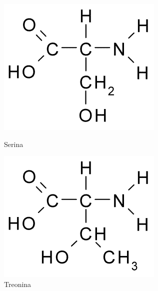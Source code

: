 \documentclass[a4paper,12pt]{article}
\begin{document}
	 \vspace{-1cm}
	\begin{figure}[H]
		\begin{center}
			\begin{minipage}{0.45\linewidth}
				\centering   
				\includegraphics[width=0.5\linewidth]{serine.png}	
				\caption{Serina}
				\label{fig:serine}
			\end{minipage}
			\begin{minipage}{0.45\linewidth}
				\centering   
				\includegraphics[width=0.5\linewidth]{threonine.png}
				\caption{Treonina}
				\label{fig:threonine}
			\end{minipage}
		\end{center}
	\end{figure}
 	
\end{document}
